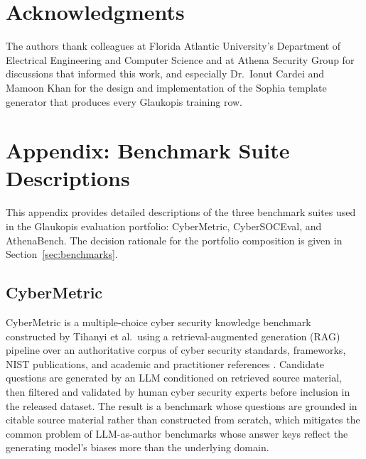 \documentclass[webpdf,contemporary,large]{oup-authoring-template}
\theoremstyle{thmstyleone}
\theoremstyle{thmstyletwo}
\theoremstyle{thmstylethree}
\begin{document}
\section{Acknowledgments}
The authors thank colleagues at Florida Atlantic University's Department of Electrical Engineering and Computer Science and at Athena Security Group for discussions that informed this work, and especially Dr.~Ionut Cardei and Mamoon Khan for the design and implementation of the Sophia template generator that produces every Glaukopis training row.



\setcounter{section}{0}
\renewcommand{\thesection}{\Alph{section}}
\section{Appendix: Benchmark Suite Descriptions}
\label{app:benchmarks}

This appendix provides detailed descriptions of the three benchmark suites used in the Glaukopis evaluation portfolio: CyberMetric, CyberSOCEval, and AthenaBench. The decision rationale for the portfolio composition is given in Section~\ref{sec:benchmarks}.

\subsection{CyberMetric}
\label{sec:cybermetric}

CyberMetric is a multiple-choice cyber security knowledge benchmark constructed by Tihanyi et al.\ using a retrieval-augmented generation (RAG) pipeline over an authoritative corpus of cyber security standards, frameworks, NIST publications, and academic and practitioner references \cite{tihanyi2024cybermetric}. Candidate questions are generated by an LLM conditioned on retrieved source material, then filtered and validated by human cyber security experts before inclusion in the released dataset. The result is a benchmark whose questions are grounded in citable source material rather than constructed from scratch, which mitigates the common problem of LLM-as-author benchmarks whose answer keys reflect the generating model's biases more than the underlying domain.
\end{document}
